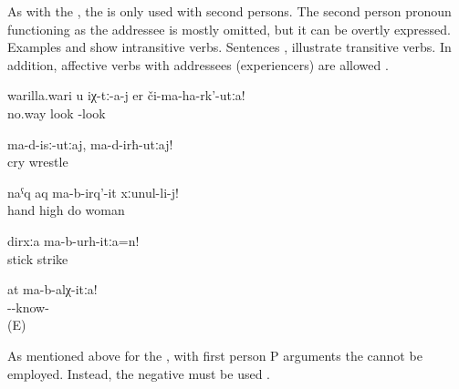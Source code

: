 As with the , the  is only used with second persons. The second person pronoun functioning as the addressee is mostly omitted, but it can be overtly expressed. Examples  and  show intransitive verbs. Sentences ,  illustrate transitive verbs. In addition, affective verbs with  addressees (experiencers) are allowed .

\begin{exe}
	\ex	\label{ex:No way you look at them}
	\gll	warilla.wari	u	iχ-tː-a-j	er	či-ma-ha-rk'-utːa!\\
		no.way			look	-look\\
	\glt	{}

	\ex	\label{ex:Do not cry, do not wrestle}
	\gll	ma-d-isː-utːaj,		ma-d-irħ-utːaj!\\
		cry	wrestle\\
	\glt	{}\pagebreak

	\ex	\label{ex:Do not raise your hand against your wife}
	\gll	naˁq	aq	ma-b-irq'-it	xːunul-li-j!\\
		hand	high	do	woman\\
	\glt	{}

	\ex	\label{ex:Do not hit with a stick}
	\gll	dirxːa	ma-b-urh-itːa=n!\\
		stick	strike\\
	\glt	{}

	\ex	\label{ex:Do not know this}
	\gll	at	ma-b-alχ-itːa!\\
			--know-\\
	\glt	{} (E)
\end{exe}

As mentioned above for the , with first person P arguments the  cannot be employed. Instead, the negative  must be used .

